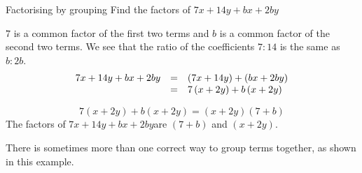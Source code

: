 
\label{m39394*secfhsst!!!underscore!!!id2835}\vspace{.5cm} 
\noindent


\begin{wex}{Factorising by grouping }{Find the factors of $7x+14y+bx+2by$}
{


\label{m39394*id278721} $7$ is a common factor of the first two terms and $b$ is a common factor of the second two terms. We see that the ratio of the coefficients $7:14$ is the same as $b:2b$.
\begin{equation*}
 \begin{array}{ccl}

7x+14y+bx+2by&=& (7x+14y)+(bx+2by)  \hfill\\ 
&=&7\left(x+2y\right)+b\left(x+2y\right) \hfill 
\end{array}
\end{equation*}


\begin{equation*}
7\left(x+2y\right)+b\left(x+2y\right)=\left(x+2y\right)\left(7+b\right)
\end{equation*}
\label{m39394*id278906}The factors of $7x+14y+bx+2by$\hspace{1ex}are $\left(7+b\right)$ and $\left(x+2y\right)$.
\par 
}
\end{wex}

There is sometimes more than one correct way to group terms together, as shown in this example.

